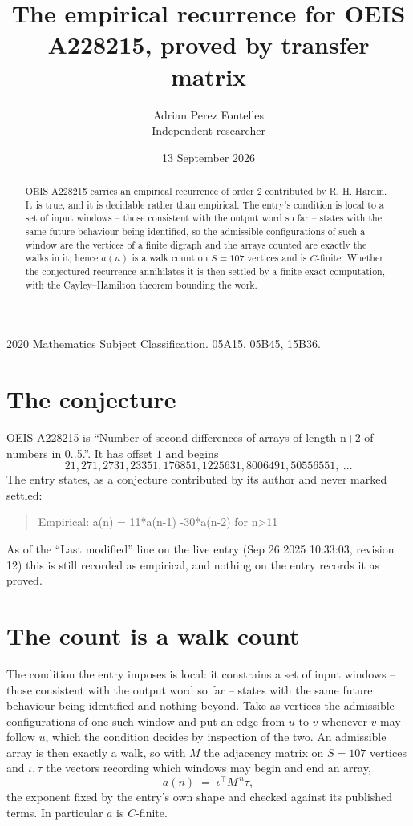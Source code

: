 \documentclass[11pt,a4paper]{article}
\title{The empirical recurrence for OEIS A228215, proved by transfer matrix}
\author{Adrian Perez Fontelles\\ \small Independent researcher}
\date{13 September 2026}
\theoremstyle{plain}
\theoremstyle{definition}
\begin{document}
\maketitle

\begin{abstract}
OEIS A228215 carries an empirical recurrence of order $2$ contributed by R. H. Hardin. It is
true, and it is decidable rather than empirical. The entry's condition is local to a set of input windows -- those consistent with the output word so far -- states with the same future behaviour being identified, so
the admissible configurations of such a window are the vertices of a finite digraph and the
arrays counted are exactly the walks in it; hence $a(n)$ is a walk count on $S=107$ vertices
and is $C$-finite. Whether the conjectured recurrence annihilates it is then settled by a
finite exact computation, with the Cayley--Hamilton theorem bounding the work.
\end{abstract}

\noindent\small 2020 Mathematics Subject Classification. 05A15, 05B45, 15B36.\normalsize

\section{The conjecture}

OEIS A228215 is ``Number of second differences of arrays of length n+2 of numbers in 0..5.''. It has offset $1$ and begins
\[
21, 271, 2731, 23351, 176851, 1225631, 8006491, 50556551,\ \dots
\]
The entry states, as a conjecture contributed by its author and never marked settled:
\begin{quote}
Empirical: a(n) = 11*a(n-1) -30*a(n-2) for n>11
\end{quote}
As of the ``Last modified'' line on the live entry (Sep 26 2025 10:33:03, revision 12) this is still
recorded as empirical, and nothing on the entry records it as proved.

\section{The count is a walk count}

The condition the entry imposes is local: it constrains a set of input windows -- those consistent with the output word so far -- states with the same future behaviour being identified and nothing beyond. Take as
vertices the admissible configurations of one such window and put an edge from $u$ to $v$
whenever $v$ may follow $u$, which the condition decides by inspection of the two. An
admissible array is then exactly a walk, so with $M$ the adjacency matrix on $S=107$ vertices
and $\iota,\tau$ the vectors recording which windows may begin and end an array,
\[
a(n)\;=\;\iota^{\!\top}M^{\,n}\tau ,
\]
the exponent fixed by the entry's own shape and checked against its published terms. In
particular $a$ is $C$-finite.
\end{document}
